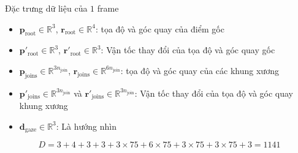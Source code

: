 \begin{frame}{Đặc trưng dữ liệu của $1$ frame}
	{\small
		\begin{itemize}
			\item $\mathbf{p}_{\text{root}} \in \mathbb{R}^3$, $\mathbf{r}_{\text{root}} \in \mathbb{R}^4$: tọa độ và góc quay của điểm gốc
			\item $\mathbf{p}'_{\text{root}} \in \mathbb{R}^3$, $\mathbf{r}'_{\text{root}} \in \mathbb{R}^3$: Vận tốc thay đổi của tọa độ và góc quay gốc
			\item $\mathbf{p}_{\text{joins}} \in \mathbb{R}^{3 n_{\text{join} }}$, $\mathbf{r}_{\text{joins}} \in \mathbb{R}^{6 n_{\text{join} }}$: tọa độ và góc quay của các khung xương
			\item $\mathbf{p}'_{\text{joins}} \in \mathbb{R}^{3n_{\text{join} }}$ và $\mathbf{r}'_{\text{joins}} \in \mathbb{R}^{3n_{\text{join} }}$: Vận tốc thay đổi của tọa độ và góc quay khung xương
			\item $\mathbf{d}_{\text{gaze}} \in \mathbb{R}^3$: Là hướng nhìn
	\end{itemize}}
	\vspace{-10pt}
	{\small
		\begin{equation*}
			D = 3 + 4 + 3 + 3 + 3 \times 75 + 6 \times 75 + 3 \times 75 + 3 \times 75 + 3 = 1141
	\end{equation*}}
			
			
	
\end{frame}




